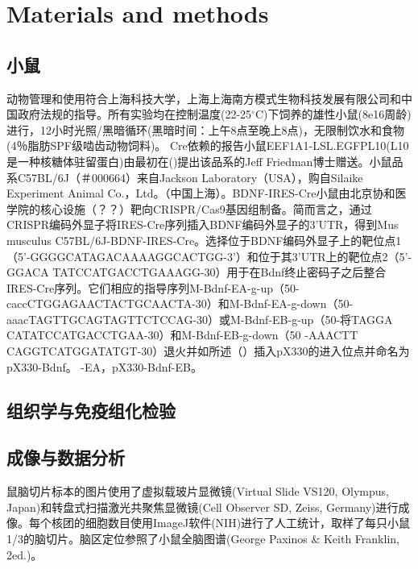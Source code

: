 \chapter{Materials and methods}

\section{小鼠}
动物管理和使用符合上海科技大学，上海上海南方模式生物科技发展有限公司和中国政府法规的指导。所有实验均在控制温度(22-25$^\circ$C)下饲养的雄性小鼠(8e16周龄)进行，12小时光照/黑暗循环(黑暗时间：上午8点至晚上8点)，无限制饮水和食物(4％脂肪SPF级啮齿动物饲料)。
Cre依赖的报告小鼠EEF1A1-LSL.EGFPL10(L10是一种核糖体驻留蛋白)由最初在(\cite{stanley2013profiling})提出该品系的Jeff Friedman博士赠送。小鼠品系C57BL/6J（＃000664）来自Jackson Laboratory（USA），购自Silaike Experiment Animal Co.，Ltd。（中国上海）。BDNF-IRES-Cre小鼠由北京协和医学院的核心设施（？？）靶向CRISPR/Cas9基因组制备。简而言之，通过CRISPR编码外显子将IRES-Cre序列插入BDNF编码外显子的3'UTR，得到Mus musculus C57BL/6J-BDNF-IRES-Cre。选择位于BDNF编码外显子上的靶位点1（5'-GGGGCATAGACAAAAGGCACTGG-3'）和位于其3'UTR上的靶位点2（5'-GGACA TATCCATGACCTGAAAGG-30）用于在Bdnf终止密码子之后整合IRES-Cre序列。它们相应的指导序列M-Bdnf-EA-g-up（50-caccCTGGAGAACTACTGCAACTA-30）和M-Bdnf-EA-g-down（50-aaacTAGTTGCAGTAGTTCTCCAG-30）或M-Bdnf-EB-g-up（50-将TAGGA CATATCCATGACCTGAA-30）和M-Bdnf-EB-g-down（50 -AAACTT CAGGTCATGGATATGT-30）退火并如所述（\cite{mizuno2014simple}）插入pX330的进入位点并命名为pX330-Bdnf。 -EA，pX330-Bdnf-EB。
\section{}

\section{}

\section{组织学与免疫组化检验}

\section{成像与数据分析}
鼠脑切片标本的图片使用了虚拟载玻片显微镜(Virtual Slide VS120, Olympus, Japan)和转盘式扫描激光共聚焦显微镜(Cell Observer SD, Zeiss, Germany)进行成像。每个核团的细胞数目使用ImageJ软件(NIH)进行了人工统计，取样了每只小鼠1/3的脑切片。脑区定位参照了小鼠全脑图谱(George Paxinos \& Keith Franklin, 2ed.)。